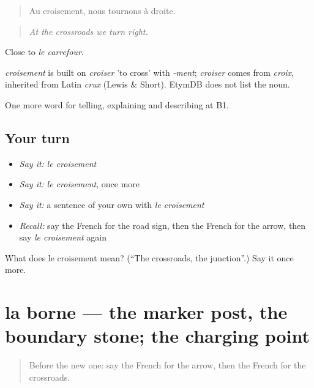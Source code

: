 \begin{quote}
Au croisement, nous tournons à droite.
\end{quote}

\begin{quote}
\emph{At the crossroads we turn right.}
\end{quote}

Close to \emph{le carrefour}.

\begin{cousinweb}
\emph{croisement} is built on \emph{croiser} 'to cross' with \emph{-ment}; \emph{croiser} comes from \emph{croix}, inherited from Latin \emph{crux} (Lewis \& Short). EtymDB does not list the noun.
\end{cousinweb}

\begin{grammarlens}[title={What you've built}]
One more word for telling, explaining and describing at B1.
\end{grammarlens}

\subsection*{Your turn}
\begin{itemize}
\raggedright
  \item \emph{Say it:} \emph{le croisement}
  \item \emph{Say it:} \emph{le croisement}, once more
  \item \emph{Say it:} a sentence of your own with \emph{le croisement}
  \item \emph{Recall:} say the French for the road sign, then the French for the arrow, then say \emph{le croisement} again
\end{itemize}

\begin{tcolorbox}[breakable,colback=teal!4,colframe=teal!35!black,title={Before you move on}]
What does le croisement mean? (\textquotedblleft{}The crossroads, the junction\textquotedblright{}.) Say it once more.
\end{tcolorbox}
\section[la borne]{la borne — the marker post, the boundary stone; the charging point}

\label{lesson:FR-C435-borne}



\begin{quote}
Before the new one: say the French for the arrow, then the French for the crossroads.
\end{quote}


